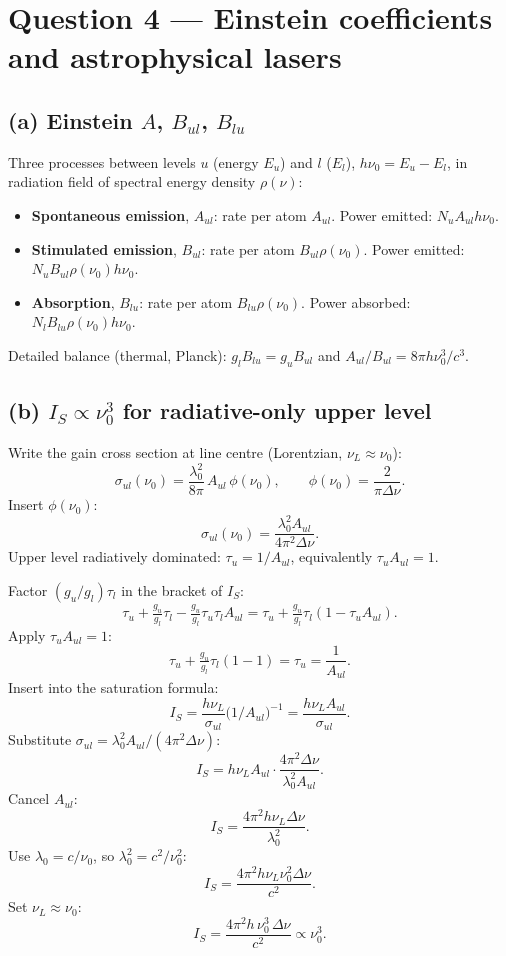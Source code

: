 \documentclass[11pt]{article}
\begin{document}
\section*{Question 4 --- Einstein coefficients and astrophysical lasers}

\subsection*{(a) Einstein $A$, $B_{ul}$, $B_{lu}$}

Three processes between levels $u$ (energy $E_u$) and $l$ ($E_l$), $h\nu_0=E_u-E_l$, in radiation field of spectral energy density $\rho(\nu)$:
\begin{itemize}
\item \textbf{Spontaneous emission}, $A_{ul}$: rate per atom $A_{ul}$. Power emitted: $N_u A_{ul} h\nu_0$.
\item \textbf{Stimulated emission}, $B_{ul}$: rate per atom $B_{ul}\rho(\nu_0)$. Power emitted: $N_u B_{ul}\rho(\nu_0) h\nu_0$.
\item \textbf{Absorption}, $B_{lu}$: rate per atom $B_{lu}\rho(\nu_0)$. Power absorbed: $N_l B_{lu}\rho(\nu_0) h\nu_0$.
\end{itemize}
Detailed balance (thermal, Planck): $g_l B_{lu}=g_u B_{ul}$ and $A_{ul}/B_{ul}=8\pi h\nu_0^3/c^3$.

\subsection*{(b) $I_S\propto\nu_0^3$ for radiative-only upper level}

Write the gain cross section at line centre (Lorentzian, $\nu_L\approx\nu_0$):
\[
\sigma_{ul}(\nu_0) = \frac{\lambda_0^2}{8\pi}\,A_{ul}\,\phi(\nu_0),\qquad \phi(\nu_0)=\frac{2}{\pi\Delta\nu}.
\]
Insert $\phi(\nu_0)$:
\[
\sigma_{ul}(\nu_0) = \frac{\lambda_0^2 A_{ul}}{4\pi^2\Delta\nu}.
\]
Upper level radiatively dominated: $\tau_u = 1/A_{ul}$, equivalently $\tau_u A_{ul} = 1$.

Factor $(g_u/g_l)\tau_l$ in the bracket of $I_S$:
\[
\tau_u + \tfrac{g_u}{g_l}\tau_l - \tfrac{g_u}{g_l}\tau_u\tau_l A_{ul}
= \tau_u + \tfrac{g_u}{g_l}\tau_l(1-\tau_u A_{ul}).
\]
Apply $\tau_u A_{ul}=1$:
\[
\tau_u + \tfrac{g_u}{g_l}\tau_l(1-1) = \tau_u = \frac{1}{A_{ul}}.
\]
Insert into the saturation formula:
\[
I_S = \frac{h\nu_L}{\sigma_{ul}}\bigl(1/A_{ul}\bigr)^{-1} = \frac{h\nu_L A_{ul}}{\sigma_{ul}}.
\]
Substitute $\sigma_{ul}=\lambda_0^2 A_{ul}/(4\pi^2\Delta\nu)$:
\[
I_S = h\nu_L A_{ul}\cdot\frac{4\pi^2\Delta\nu}{\lambda_0^2 A_{ul}}.
\]
Cancel $A_{ul}$:
\[
I_S = \frac{4\pi^2 h\nu_L\Delta\nu}{\lambda_0^2}.
\]
Use $\lambda_0 = c/\nu_0$, so $\lambda_0^2 = c^2/\nu_0^2$:
\[
I_S = \frac{4\pi^2 h\nu_L\nu_0^2\Delta\nu}{c^2}.
\]
Set $\nu_L\approx\nu_0$:
\[
\boxed{\;I_S = \frac{4\pi^2 h\,\nu_0^3\,\Delta\nu}{c^2}\propto \nu_0^3.\;}
\]
\end{document}

